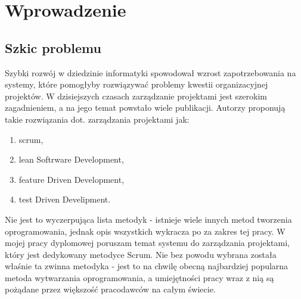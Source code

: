\chapter{Wprowadzenie}
\section{Szkic problemu}

Szybki rozwój w dziedzinie informatyki spowodował wzrost zapotrzebowania na systemy, które pomogłyby rozwiązywać problemy kwestii organizacyjnej projektów. W dzisiejszych czasach zarządzanie projektami jest szerokim zagadnieniem, a na jego temat powstało wiele publikacji. Autorzy proponują takie rozwiązania dot. zarządzania projektami jak:
\begin{enumerate}
	\item scrum,
	\item lean Softrware Development,
	\item feature Driven Development,
	\item test Driven Develipment.
\end{enumerate}

Nie jest to wyczerpująca lista metodyk - istnieje wiele innych metod tworzenia oprogramowania, jednak opis wszystkich wykracza po za zakres tej pracy. W mojej pracy dyplomowej poruszam temat systemu do zarządzania projektami, który jest dedykowany metodyce Scrum. Nie bez powodu wybrana została właśnie ta zwinna metodyka - jest to na chwilę obecną najbardziej popularna metoda wytwarzania oprogramowania, a umiejętności pracy wraz z nią są pożądane przez większość pracodawców na całym świecie.

